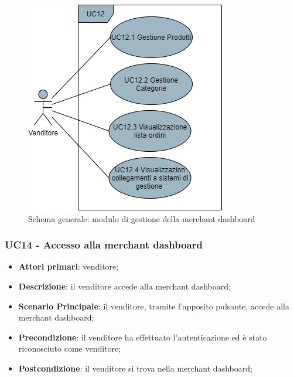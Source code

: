 \begin{figure}[H]
\centering
\includegraphics[scale=0.6]{res/UseCase/Immagini/MerchantDashboard}
\caption{Schema generale: modulo di gestione della merchant dashboard}
\end{figure}

\subsubsection{UC14 - Accesso alla merchant dashboard}
\begin{itemize}
\item \textbf{Attori primari}: venditore;
\item \textbf{Descrizione}: il venditore accede alla merchant dashboard;
\item \textbf{Scenario Principale}: il venditore, tramite l'apposito pulsante, accede alla merchant dashboard;
\item \textbf{Precondizione}: il venditore ha effettuato l'autenticazione ed è stato riconosciuto come venditore;
\item \textbf{Postcondizione}: il venditore si trova nella merchant dashboard;
\end{itemize}

